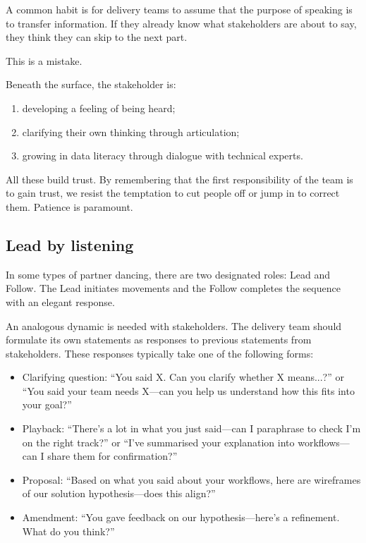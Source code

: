 \documentclass[10pt,openany,10pt]{book}
\providecommand{\tightlist}{%
  \setlength{\itemsep}{0pt}\setlength{\parskip}{0pt}}
\begin{document}
A common habit is for delivery teams to assume that the purpose of
speaking is to transfer information. If they already know what
stakeholders are about to say, they think they can skip to the next
part.

This is a mistake.

Beneath the surface, the stakeholder is:

\begin{enumerate}
\def\labelenumi{\arabic{enumi}.}
\tightlist
\item
  developing a feeling of being heard;
\item
  clarifying their own thinking through articulation;
\item
  growing in data literacy through dialogue with technical experts.
\end{enumerate}

All these build trust. By remembering that the first responsibility of
the team is to gain trust, we resist the temptation to cut people off or
jump in to correct them. Patience is paramount.

\subsection{Lead by listening}\label{lead-by-listening}

In some types of partner dancing, there are two designated roles: Lead
and Follow. The Lead initiates movements and the Follow completes the
sequence with an elegant response.

An analogous dynamic is needed with stakeholders. The delivery team
should formulate its own statements as responses to previous statements
from stakeholders. These responses typically take one of the following
forms:

\begin{itemize}
\item
  Clarifying question: ``You said X. Can you clarify whether X
  means...?'' or ``You said your team needs X---can you help us
  understand how this fits into your goal?''
\item
  Playback: ``There's a lot in what you just said---can I paraphrase to
  check I'm on the right track?'' or ``I've summarised your explanation
  into workflows---can I share them for confirmation?''
\item
  Proposal: ``Based on what you said about your workflows, here are
  wireframes of our solution hypothesis---does this align?''
\item
  Amendment: ``You gave feedback on our hypothesis---here's a
  refinement. What do you think?''
\end{itemize}
\end{document}
